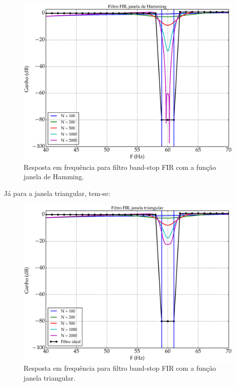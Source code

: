\begin{figure}[H]
  \centering
  \includegraphics[scale=0.55]{images/plots/bandstop_FIR_hamming_window}
  \caption{Resposta em frequência para filtro band-stop FIR com a função janela de Hamming.}
  \label{fig:bandstop_FIR_hamming}
\end{figure}

\newpage

Já para a janela triangular, tem-se:

\begin{figure}[H]
  \centering
  \includegraphics[scale=0.55]{images/plots/bandstop_FIR_triang_window}
  \caption{Resposta em frequência para filtro band-stop FIR com a função janela  triangular.}
  \label{fig:bandstop_FIR_triangular}
\end{figure}


